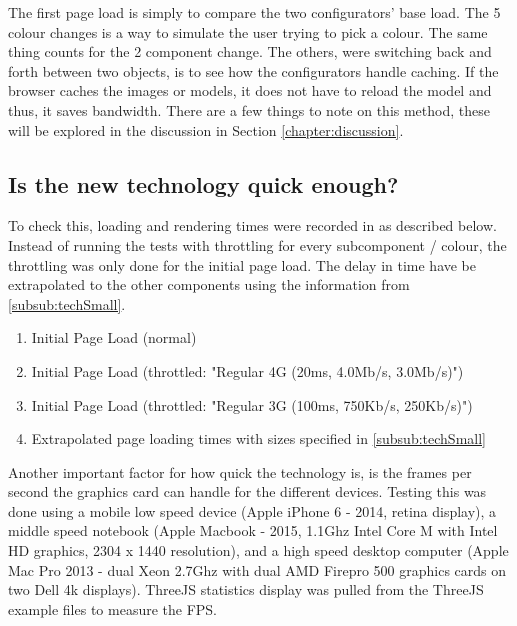 The first page load is simply to compare the two configurators' base load. The 5 colour changes is a way to simulate the user trying to pick a colour. The same thing counts for the 2 component change. The others, were switching back and forth between two objects, is to see how the configurators handle caching. If the browser caches the images or models, it does not have to reload the model and thus, it saves bandwidth.
There are a few things to note on this method, these will be explored in the discussion in Section \ref{chapter:discussion}.


\subsection{Is the new technology quick enough?}
To check this, loading and rendering times were recorded in as described below. Instead of running the tests with throttling for every subcomponent / colour, the throttling was only done for the initial page load. The delay in time have be extrapolated to the other components using the information from \ref{subsub:techSmall}.
​\begin{enumerate}
\item {Initial Page Load (normal)}
\item {Initial Page Load (throttled: "Regular 4G (20ms, 4.0Mb/s, 3.0Mb/s)")}
\item {Initial Page Load (throttled: "Regular 3G (100ms, 750Kb/s, 250Kb/s)")}
\item {Extrapolated page loading times with sizes specified in \ref{subsub:techSmall}}
\end{enumerate}

Another important factor for how quick the technology is, is the frames per second the graphics card can handle for the different devices. Testing this was done using a mobile low speed device (Apple iPhone 6 - 2014, retina display), a middle speed notebook (Apple Macbook - 2015, 1.1Ghz Intel Core M with Intel HD graphics, 2304 x 1440 resolution), and a high speed desktop computer (Apple Mac Pro 2013 - dual Xeon 2.7Ghz with dual AMD Firepro 500 graphics cards on two Dell 4k displays). ThreeJS statistics display was pulled from the ThreeJS example files to measure the FPS.

